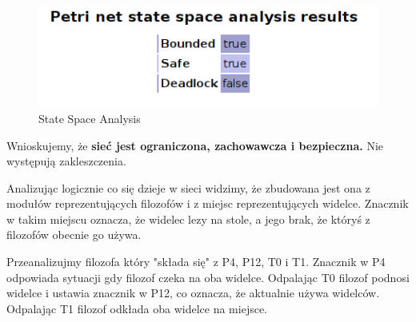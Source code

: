 \documentclass[12pt,a4paper,table]{article}
\begin{document}
    \begin{figure}[H]
        \centering
        \includegraphics[width=0.6\linewidth]{img/zad8-3.png}
        \caption{State Space Analysis}
        \label{fig:zad8-3}
    \end{figure}

    Wnioskujemy, że \textbf{sieć jest ograniczona, zachowawcza i bezpieczna.}
    Nie występują zakleszczenia.

    Analizując logicznie co się dzieje w sieci widzimy, że zbudowana jest ona z modułów reprezentujących
    filozofów i z miejsc reprezentujących widelce. Znacznik w takim miejscu oznacza, że widelec lezy na stole,
    a jego brak, że któryś z filozofów obecnie go używa.

    Przeanalizujmy filozofa który "składa się" z P4, P12, T0 i T1.
    Znacznik w P4 odpowiada sytuacji gdy filozof czeka na oba widelce. Odpalając T0 filozof podnosi widelce
    i ustawia znacznik w P12, co oznacza, że aktualnie używa widelców. Odpalając T1 filozof odkłada oba widelce na miejsce.
\end{document}
